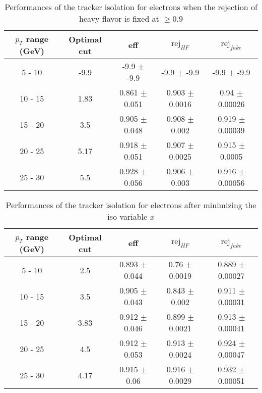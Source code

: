 \begin{table}[htbp]
   \centering
   \begin{tabular}{|c|c|c|c|c|}
      \hline
      $p_T$ range (GeV) & Optimal cut & eff & $\textrm{rej}_{HF}$ & $\textrm{rej}_{fake}$ \\
      \hline
      5 - 10 & -9.9 & -9.9 $\pm$ -9.9 & -9.9 $\pm$ -9.9 & -9.9 $\pm$ -9.9 \\
      \hline
      10 - 15 & 1.83 & 0.861 $\pm$ 0.051 & 0.903 $\pm$ 0.0016 & 0.94 $\pm$ 0.00026 \\
      \hline
      15 - 20 & 3.5 & 0.905 $\pm$ 0.048 & 0.908 $\pm$ 0.002 & 0.919 $\pm$ 0.00039 \\
      \hline
      20 - 25 & 5.17 & 0.918 $\pm$ 0.051 & 0.907 $\pm$ 0.0025 & 0.915 $\pm$ 0.0005 \\
      \hline
      25 - 30 & 5.5 & 0.928 $\pm$ 0.056 & 0.906 $\pm$ 0.003 & 0.916 $\pm$ 0.00056 \\
      \hline
   \end{tabular}
   \caption{\small{Performances of the tracker isolation for electrons when the rejection of heavy flavor is fixed at $\geq 0.9$}\label{tab:track_elec_pureHf}}
\end{table}






\begin{table}[htbp]
   \centering
   \begin{tabular}{|c|c|c|c|c|}
      \hline
      $p_T$ range (GeV) & Optimal cut & eff & $\textrm{rej}_{HF}$ & $\textrm{rej}_{fake}$ \\
      \hline
      5 - 10 & 2.5 & 0.893 $\pm$ 0.044 & 0.76 $\pm$ 0.0019 & 0.889 $\pm$ 0.00027 \\
      \hline
      10 - 15 & 3.5 & 0.905 $\pm$ 0.043 & 0.843 $\pm$ 0.002 & 0.911 $\pm$ 0.00031 \\
      \hline
      15 - 20 & 3.83 & 0.912 $\pm$ 0.046 & 0.899 $\pm$ 0.0021 & 0.913 $\pm$ 0.00041 \\
      \hline
      20 - 25 & 4.5 & 0.912 $\pm$ 0.053 & 0.913 $\pm$ 0.0024 & 0.924 $\pm$ 0.00047 \\
      \hline
      25 - 30 & 4.17 & 0.915 $\pm$ 0.06 & 0.916 $\pm$ 0.0029 & 0.932 $\pm$ 0.00051 \\
      \hline
   \end{tabular}
   \caption{\small{Performances of the tracker isolation for electrons after minimizing the iso variable $x$}\label{tab:track_elec_opt}}
\end{table}






